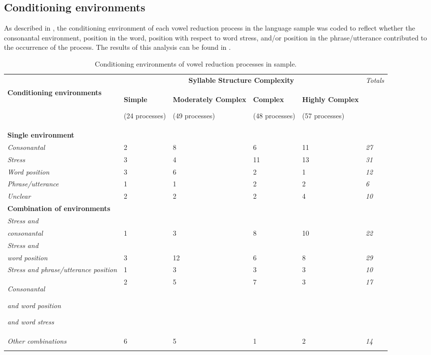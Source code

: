 \subsection{Conditioning environments}\label{sec:6.3.4}

  As described in , the conditioning environment of each vowel reduction process in the language sample was coded to reflect whether the consonantal environment, position in the word, position with respect to word stress, and/or position in the phrase/utterance contributed to the occurrence of the process. The results of this analysis can be found in .

\begin{table}
\begin{tabularx}{\textwidth}{XXXXXX}
\lsptoprule
 & \multicolumn{4}{c}{ \textbf{Syllable Structure Complexity}} & \textit{Totals}\\
 \textbf{Conditioning environments} & { \textbf{Simple}}

 (24 processes) & { \textbf{Moderately Complex}}

 (49 processes) & { \textbf{Complex}}

 (48 processes) & { \textbf{Highly Complex}}

 (57 processes) & \\
 \textbf{Single environment} & \multicolumn{5}{c}{}\\
 \textit{Consonantal} & 2 & 8 & 6 & 11 & \textit{27}\\
 \textit{Stress} & 3 & 4 & 11 & 13 & \textit{31}\\
 \textit{Word position} & 3 & 6 & 2 & 1 & \textit{12}\\
 \textit{Phrase/utterance} & 1 & 1 & 2 & 2 & \textit{6}\\
 \textit{Unclear} & 2 & 2 & 2 & 4 & \textit{10}\\
 \textbf{Combination of environments} & \multicolumn{5}{c}{}\\
 \textit{Stress and} \\
\textit{consonantal} & 1 & 3 & 8 & 10 & \textit{22}\\
 \textit{Stress and} \\
\textit{word position} & 3 & 12 & 6 & 8 & \textit{29}\\
 \textit{Stress and phrase/utterance position} & 1 & 3 & 3 & 3 & \textit{10}\\
{ \textit{Consonantal} }

{ \textit{and word position} }

 \textit{and word stress} & 2 & 5 & 7 & 3 & \textit{17}\\
 \textit{Other combinations} & 6 & 5 & 1 & 2 & \textit{14}\\
\lspbottomrule
\end{tabularx}
\caption{\label{tab:6.6}Conditioning environments of vowel reduction processes in sample.}
\end{table}

